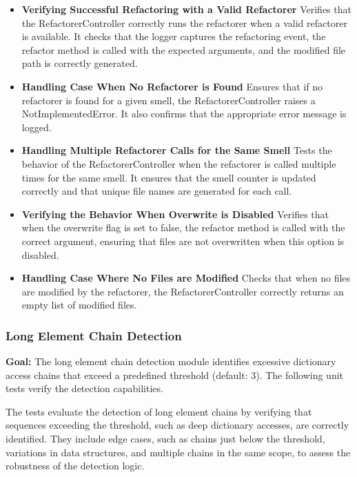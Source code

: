 \documentclass[12pt, titlepage]{article}
\begin{document}
\begin{itemize}
\item \textbf{Verifying Successful Refactoring with a Valid Refactorer} \newline
Verifies that the RefactorerController correctly runs the refactorer when a valid refactorer is available. It checks that the logger captures the refactoring event, the refactor method is called with the expected arguments, and the modified file path is correctly generated.

\item \textbf{Handling Case When No Refactorer is Found} \newline
Ensures that if no refactorer is found for a given smell, the RefactorerController raises a NotImplementedError. It also confirms that the appropriate error message is logged.

\item \textbf{Handling Multiple Refactorer Calls for the Same Smell} \newline
Tests the behavior of the RefactorerController when the refactorer is called multiple times for the same smell. It ensures that the smell counter is updated correctly and that unique file names are generated for each call.

\item \textbf{Verifying the Behavior When Overwrite is Disabled} \newline
Verifies that when the overwrite flag is set to false, the refactor method is called with the correct argument, ensuring that files are not overwritten when this option is disabled.

\item \textbf{Handling Case Where No Files are Modified} \newline
Checks that when no files are modified by the refactorer, the RefactorerController correctly returns an empty list of modified files.
\end{itemize}


\subsubsection{Long Element Chain Detection}

\textbf{Goal:} The long element chain detection module identifies excessive dictionary access chains that exceed a predefined threshold (default: 3). The following unit tests verify the detection capabilities. \

The tests evaluate the detection of long element chains by verifying that sequences exceeding the threshold, such as deep dictionary accesses, are correctly identified. They include edge cases, such as chains just below the threshold, variations in data structures, and multiple chains in the same scope, to assess the robustness of the detection logic.
\end{document}
